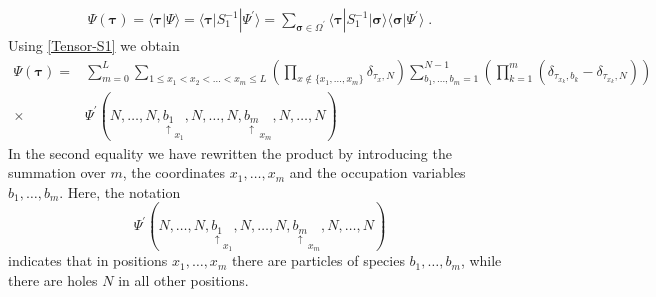 \documentclass[10pt]{article}
\numberwithin{equation}{section}
\numberwithin{equation}{subsection}
\newcommand{\co}{\;,}
\newcommand{\dt}{\;.}
\begin{document}
{\color{blue}
	\begin{align}
		\Psi(\bm{\tau})=\langle \bm{\tau}|\Psi\rangle=\langle \bm{\tau}|S^{-1}_{1}|\Psi^{'}\rangle=\sum_{\bm{\sigma}\in \Omega^{'}}\langle \bm{\tau}|S_{1}^{-1}|\bm{\sigma}\rangle \langle \bm{\sigma}|\Psi^{'}\rangle\dt
	\end{align}
	Using \eqref{Tensor-S1} we obtain 
			 \begin{align}\label{implicit-PSI-PSIp}
			\Psi(\bm{\tau})=&\sum_{m=0}^{L}\sum_{1\leq x_{1}<x_{2}<\ldots<x_{m}\leq L}\left(\prod_{x\notin\{x_{1},\ldots,x_{m}\}}\delta_{\tau_{x},N}\right)\sum_{b_{1},\ldots,b_{m}=1}^{N-1}\left(\prod_{k=1}^{m}(\delta_{\tau_{x_{k}},b_{k}}-\delta_{\tau_{x_{k}},N})\right)\nonumber\\
			\times &			
			\Psi^{'}(N,\ldots,N,\underset{\uparrow}{b_{1}}_{x_{1}},N,\ldots,N,\underset{\uparrow}{b_{m}}_{x_{m}},N,\ldots,N)
		\end{align} 
			In the second equality we have rewritten the product by introducing the summation over $m$, the coordinates $x_{1},\ldots,x_{m}$ and the occupation variables $b_{1},\ldots,b_{m}$. Here, the notation
		\begin{equation}\label{notation-PSI}
			\Psi^{'}(N,\ldots,N,\underset{\uparrow}{b_{1}}_{x_{1}},N,\ldots,N,\underset{\uparrow}{b_{m}}_{x_{m}},N,\ldots,N)
		\end{equation}
		indicates that in positions $x_{1},\ldots,x_{m}$ there are particles of species $b_{1},\ldots,b_{m}$, while there are holes $N$ in all other positions.} %
\end{document}
